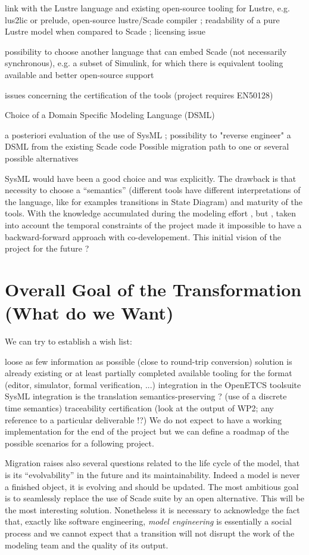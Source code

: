 \documentclass{template/openetcs_report}
\begin{document}
link with the Lustre language and existing open-source tooling for Lustre, e.g. lus2lic or prelude, open-source lustre/Scade compiler ; readability of a pure Lustre model when compared to Scade ; licensing issue

possibility to choose another language that can embed Scade (not
necessarily synchronous), e.g. a subset of Simulink, for which there
is equivalent tooling available and better open-source support

issues concerning the certification of the tools (project requires EN50128)

Choice of a Domain Specific Modeling Language (DSML)

a posteriori evaluation of the use of SysML ; possibility to "reverse
engineer" a DSML from the existing Scade code Possible migration path
to one or several possible alternatives


SysML would have been a good choice and was explicitly. The drawback
is that necessity to choose a ``semantics'' (different tools have
different interpretations of the language, like for examples
transitions in State Diagram) and maturity of the tools. With the
knowledge accumulated during the modeling effort , but , taken into
account the temporal constraints of the project made it impossible to
have a backward-forward approach with co-developement. This initial
vision of the project for the future ?



\chapter{Overall Goal of the Transformation (What do we Want)}
\label{cha:over-goal-transf}

We can try to establish a wish list:

loose as few information as possible (close to round-trip conversion)
solution is already existing or at least partially completed
available tooling for the format (editor, simulator, formal verification, ...)
integration in the OpenETCS toolsuite
SysML integration
is the translation semantics-preserving ? (use of a discrete time semantics)
traceability
certification (look at the output of WP2; any reference to a particular deliverable !?)
We do not expect to have a working implementation for the end of the project but we can define a roadmap of the possible scenarios for a following project.

Migration raises also several questions related to the life cycle of
the model, that is its ``evolvability'' in the future and its
maintainability. Indeed a model is never a finished object, it is
evolving and should be updated. The most ambitious goal is to
seamlessly replace the use of Scade suite by an open alternative. This
will be the most interesting solution. Nonetheless it is necessary to
acknowledge the fact that, exactly like software engineering,
\emph{model engineering} is essentially a social process and we cannot
expect that a transition will not disrupt the work of the modeling
team and the quality of its output.
\end{document}
